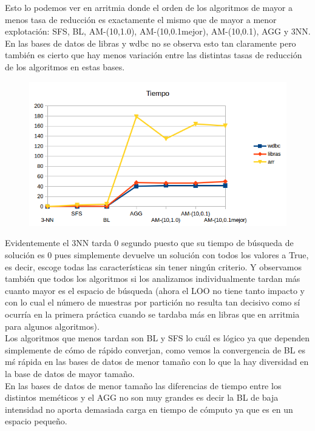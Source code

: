 \documentclass[10pt,a4paper]{article}
\begin{document}
Esto lo podemos ver en arritmia donde el orden de los algoritmos de mayor a menos tasa de reducción es exactamente el mismo que de mayor a menor explotación: SFS, BL, AM-(10,1.0), AM-(10,0.1mejor), AM-(10,0.1), AGG y 3NN.\\

En las bases de datos de libras y wdbc no se observa esto tan claramente pero también es cierto que hay menos variación entre las distintas tasas de reducción de los algoritmos en estas bases.\\

\begin{figure}[H]
\centering
\includegraphics[width=130mm]{tiempo_am.png}
\end{figure}


Evidentemente el 3NN tarda 0 segundo puesto que su tiempo de búsqueda de solución es 0 pues simplemente devuelve un solución con todos los valores a True, es decir, escoge todas las características sin tener ningún criterio. Y observamos también que todos los algoritmos si los analizamos individualmente tardan más cuanto mayor es el espacio de búsqueda (ahora el LOO no tiene tanto impacto y con lo cual el número de muestras por partición no resulta tan decisivo como sí ocurría en la primera práctica cuando se tardaba más en libras que en arritmia para algunos algoritmos).\\

Los algoritmos que menos tardan son BL y SFS lo cuál es lógico ya que dependen simplemente de cómo de rápido converjan, como vemos la convergencia de BL es mś rápida en las bases de datos de menor tamaño con lo que la hay diversidad en la base de datos de mayor tamaño.\\

En las bases de datos de menor tamaño las diferencias de tiempo entre los distintos meméticos y el AGG no son muy grandes es decir la BL de baja intensidad no aporta demasiada carga en tiempo de cómputo ya que es en un espacio pequeño.\\
\end{document}
